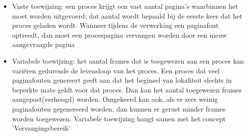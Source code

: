 \begin{itemize}
\item Vaste toewijzing: een proces krijgt een vast aantal pagina's waarbinnen het moet worden uitgevoerd; dat aantal wordt bepaald bij de eerste keer dat het proces geladen wordt. Wanneer tijdens de verwerking een paginafout optreedt, dan moet een procespagina vervangen worden door een nieuw aangevraagde pagina
\item Variabele toewijzing: het aantal frames dat is toegewezen aan een proces kan variëren gedurende de levensloop van het proces. Een proces dat veel paginafouten genereert geeft aan dat het beginsel van lokaliteit slechts in beperkte mate geldt voor dat proces. Dan kan het aantal toegewezen frames aangepast(verhoogd) worden. Omgekeerd kan ook, als er zeer weinig paginafouten gegenereerd worden, dan kunnen er gerust minder frames worden toegewezen. Variabele toewijzing hangt samen met het concept 'Vervangingsbereik'
\end{itemize}

